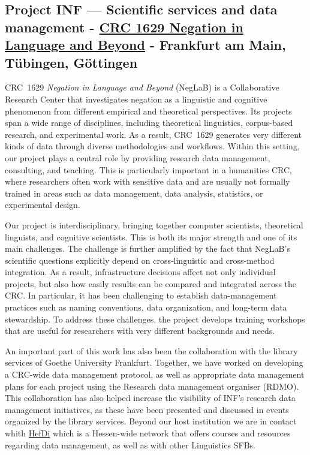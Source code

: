 \documentclass{eceasst}
\begin{document}
\subsection{Project INF --- Scientific services and data management - \href{https://www.neglab.de/}{CRC 1629 Negation in Language and Beyond} - Frankfurt am Main, Tübingen, Göttingen}
CRC~1629 \emph{Negation in Language and Beyond} (NegLaB) is a Collaborative Research Center that investigates negation as a linguistic and cognitive phenomenon from different empirical and theoretical perspectives. Its projects span a wide range of disciplines, including theoretical linguistics, corpus-based research, and experimental work. As a result, CRC~1629 generates very different kinds of data through diverse methodologies and workflows. Within this setting, our project plays a central role by providing research data management, consulting, and teaching. This is particularly important in a humanities CRC, where researchers often work with sensitive data and are usually not formally trained in areas such as data management, data analysis, statistics, or experimental design.

Our project is interdisciplinary, bringing together computer scientists, theoretical linguists, and cognitive scientists. This is both its major strength and one of its main challenges. The challenge is further amplified by the fact that NegLaB’s scientific questions explicitly depend on cross-linguistic and cross-method integration. As a result, infrastructure decisions affect not only individual projects, but also how easily results can be compared and integrated across the CRC. In particular, it has been challenging to establish data-management practices such as naming conventions, data organization, and long-term data stewardship. To address these challenges, the project develops training workshops that are useful for researchers with very different backgrounds and needs.

An important part of this work has also been the collaboration with the library services of Goethe University Frankfurt. Together, we have worked on developing a CRC-wide data management protocol, as well as appropriate data management plans for each project using the Research data management organiser (RDMO). This collaboration has also helped increase the visibility of INF's research data management initiatives, as these have been presented and discussed in events organized by the library services.
Beyond our host institution we are in contact whith \href{https://www.uni-marburg.de/en/hefdi/about-hefdi}{HefDi}
which is a Hessen-wide network that offers courses and resources regarding data management, as well as with other Linguistics SFBs.
\end{document}
